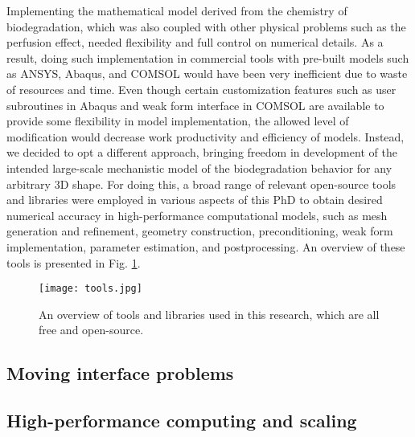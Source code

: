 Implementing the mathematical model derived from the chemistry of biodegradation, which was also coupled with other physical problems such as the perfusion effect, needed flexibility and full control on numerical details. As a result, doing such implementation in commercial tools with pre-built models such as ANSYS, Abaqus, and COMSOL would have been very inefficient due to waste of resources and time. Even though certain customization features such as user subroutines in Abaqus and weak form interface in COMSOL are available to provide some flexibility in model implementation, the allowed level of modification would decrease work productivity and efficiency of models. Instead, we decided to opt a different approach, bringing freedom in development of the intended large-scale mechanistic model of the biodegradation behavior for any arbitrary 3D shape. For doing this, a broad range of relevant open-source tools and libraries were employed in various aspects of this PhD to obtain desired numerical accuracy in high-performance computational models, such as mesh generation and refinement, geometry construction, preconditioning, weak form implementation, parameter estimation, and postprocessing. An overview of these tools is presented in Fig. \ref{fig:conclusion_tools}.

\begin{figure}[h]
\centering
\medskip
\texttt{[image: tools.jpg]}
\caption[Overview of open-source tools and libraries used in this PhD]{An overview of tools and libraries used in this research, which are all free and open-source.} \label{fig:conclusion_tools}
\end{figure}






\subsection{Moving interface problems}


\subsection{High-performance computing and scaling}



